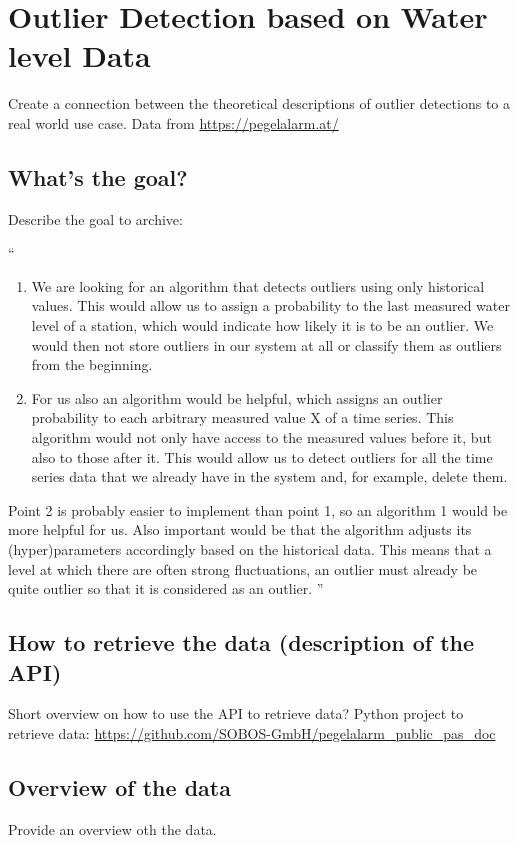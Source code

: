 \chapter{Outlier Detection based on Water level Data}
Create a connection between the theoretical descriptions of outlier detections to a real world use case. Data from \url{https://pegelalarm.at/}
\section{What's the goal?}
Describe the goal to archive: \newline
\begin{itshape}
``
\begin{enumerate}
    \item We are looking for an algorithm that detects outliers using only historical values. This would allow us to assign a probability to the last measured water level of a station, which would indicate how likely it is to be an outlier. We would then not store outliers in our system at all or classify them as outliers from the beginning.
    \item For us also an algorithm would be helpful, which assigns an outlier probability to each arbitrary measured value X of a time series. This algorithm would not only have access to the measured values before it, but also to those after it. This would allow us to detect outliers for all the time series data that we already have in the system and, for example, delete them.

\end{enumerate}
Point 2 is probably easier to implement than point 1, so an algorithm 1 would be more helpful for us. 
Also important would be that the algorithm adjusts its (hyper)parameters accordingly based on the historical data. This means that a level at which there are often strong fluctuations, an outlier must already be quite outlier so that it is considered as an outlier.
''
\end{itshape}

\section{How to retrieve the data (description of the API)}
Short overview on how to use the API to retrieve data? Python project to retrieve data: \url{https://github.com/SOBOS-GmbH/pegelalarm_public_pas_doc}
\section{Overview of the data}
Provide an overview oth the data.
